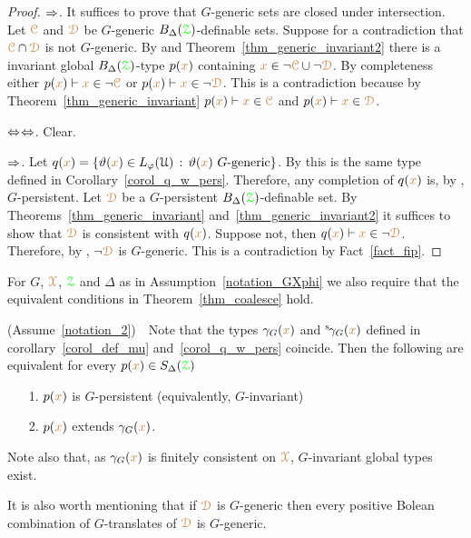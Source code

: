 \begin{proof}
  $\Rightarrow$.
  It suffices to prove that $G$-generic sets are closed under intersection.
  Let ${\color{brown}\EuScript C}$ and ${\color{brown}\EuScript D}$ be $G$-generic $B_\Delta({{\color{green}\EuScript Z}})$-definable sets.
  Suppose for a contradiction that ${\color{brown}\EuScript C}\cap{\color{brown}\EuScript D}$ is not $G$-generic.
  By  and Theorem~\ref{thm_generic_invariant2} there is a invariant global $B_\Delta({{\color{green}\EuScript Z}})$-type $p({\color{brown} x})$ containing ${\color{brown} x}\in\neg{\color{brown}\EuScript C}\cup\neg{\color{brown}\EuScript D}$.
  By completeness either $p({\color{brown} x})\vdash{\color{brown}x}\in\neg{\color{brown}\EuScript C}$ or $p({\color{brown} x})\vdash{\color{brown}x}\in\neg{\color{brown}\EuScript D}$.
  This is a contradiction because by Theorem~\ref{thm_generic_invariant} $p({\color{brown} x})\vdash{\color{brown}x}\in{\color{brown}\EuScript C}$ and $p({\color{brown} x})\vdash{\color{brown}x}\in{\color{brown}\EuScript D}$.

  $\Leftrightarrow$$\Leftrightarrow$. Clear.

  $\Rightarrow$.
  Let $q({\color{brown} x})=\{\vartheta({\color{brown} x})\in L_\varphi(\EuScript U)\,:\,\vartheta({\color{brown} x})\textrm{ $G$-generic}\}$.
  By  this is the same type defined in Corollary~\ref{corol_q_w_pers}.
  Therefore, any completion of $q({\color{brown} x})$ is, by , $G$-persistent.
  Let ${\color{brown}\EuScript D}$ be a $G$-persistent $B_\Delta({{\color{green}\EuScript Z}})$-definable set.
  By Theorems~\ref{thm_generic_invariant} and~\ref{thm_generic_invariant2} it suffices to show that ${\color{brown}\EuScript D}$ is consistent with $q({\color{brown} x})$.
  Suppose not, then $q({\color{brown} x})\vdash {\color{brown}x}\in\neg{\color{brown}\EuScript D}$.
  Therefore, by , $\neg{\color{brown}\EuScript D}$ is $G$-generic.
  This is a contradiction by Fact~\ref{fact_fip}.
\end{proof}


\begin{assumption}\label{notation_2}
  For $G$, ${\color{brown}\EuScript X}$, ${\color{green}\EuScript Z}$ and $\Delta$ as in Assumption~\ref{notation_GXphi} we also require that the equivalent conditions in Theorem~\ref{thm_coalesce} hold.
\end{assumption}

\begin{remark}\label{rem_coalesce}
  (Assume~\ref{notation_2})\ \ 
  Note that the types $\gamma_G({\color{brown} x})$ and  ${}^{\rm s}\kern-.2ex\gamma_G({\color{brown} x})$ defined in corollary~\ref{corol_def_mu} and~\ref{corol_q_w_pers} coincide.
  Then the following are equivalent for every $p({\color{brown} x})\in S_\Delta({\color{green}\EuScript Z})$
  \begin{itemize}
    \item[1.] $p({\color{brown} x})$ is $G$-persistent (equivalently, $G$-invariant)
    \item[2.] $p({\color{brown} x})$ extends $\gamma_G({\color{brown} x})$.
  \end{itemize}
  Note also that, as $\gamma_G({\color{brown} x})$ is finitely consistent on ${\color{brown}\EuScript X}$, $G$-invariant global types exist.

  It is also worth mentioning that if ${\color{brown}\EuScript D}$ is $G$-generic then every positive Bolean combination of $G$-translates of ${\color{brown}\EuScript D}$ is $G$-generic.
\end{remark}

